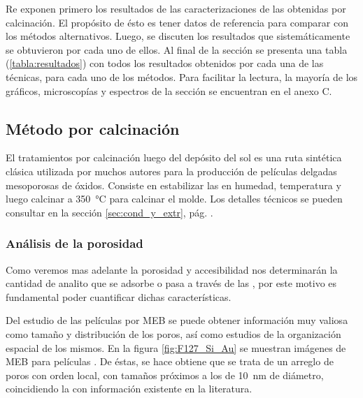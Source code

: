 	 Re exponen primero los resultados de las caracterizaciones de las \pdm\space obtenidas por calcinación. El propósito de ésto es tener datos de referencia para comparar con los métodos alternativos. Luego, se discuten los resultados que sistemáticamente se obtuvieron por cada uno de ellos. Al final de la sección se presenta una tabla (\ref{tabla:resultados}) con todos los resultados obtenidos por cada una de las técnicas, para cada uno de los métodos. Para facilitar la lectura, la mayoría de los gráficos, microscopías y espectros de la sección se encuentran en el anexo C.

	\subsection{Método por calcinación}
	 	
	 		El tratamientos por calcinación luego del depósito del sol es una ruta sintética clásica utilizada por muchos autores para la producción de películas delgadas mesoporosas de óxidos\cite{Soler-Illia2002a,Brinker1999,Soler-Illia2006,Grosso2004,Innocenzi2013,anglome2011}. Consiste en estabilizar las \pdm\space en humedad, temperatura y luego calcinar a \SI{350}{\celsius} para calcinar el molde. Los detalles técnicos se pueden consultar en la sección \ref{sec:cond_y_extr}, pág. \pageref{sec:cond_y_extr}.

	 	\subsubsection{Análisis de la porosidad}

		 Como veremos mas adelante la porosidad y accesibilidad nos determinarán la cantidad de analito que se adsorbe o pasa a través de las \pdm, por este motivo es fundamental poder cuantificar dichas características. 

		 Del estudio de las películas por MEB se puede obtener información muy valiosa como tamaño y distribución de los poros, así como estudios de la organización espacial de los mismos. En la figura \ref{fig:F127_Si_Au} se muestran imágenes de MEB para películas \pdmF. De éstas, se hace obtiene que se trata de un arreglo de poros con orden local, con tamaños próximos a los de \SI{10}{\nm} de diámetro, coincidiendo la con información existente en la literatura\cite{urade2005,angelome2011,lee2006}.  

